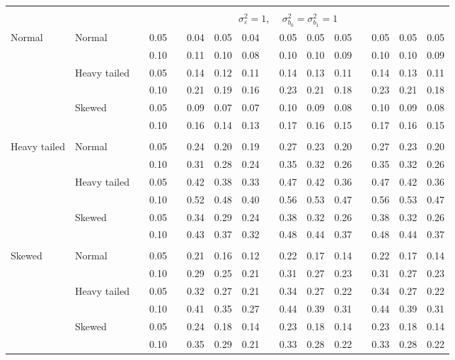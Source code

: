 \documentclass[12pt]{article} %
\begin{document}
\begin{table}[ht]
\begin{scriptsize}
\begin{center}
\begin{tabular}{ll p{.1cm} c p{.1cm} rrr p{.1cm} rrr p{.1cm} rrr}
&&&&&&&&&&&&&&&\\
& && && \multicolumn{9}{c}{$\sigma_{\varepsilon}^2 = 1$, \ \ $\sigma_{b_0}^2 = \sigma_{b_1}^2 = 1$} \\ \cline{6-16}
\rowcolor{gray!20}Normal       & Normal       && 0.05 &&   0.04 & 0.05 & 0.04 && 0.05 & 0.05 & 0.05 && 0.05 & 0.05 & 0.05 \\ 
\rowcolor{gray!20}             &              && 0.10 &&   0.11 & 0.10 & 0.08 && 0.10 & 0.10 & 0.09 && 0.10 & 0.10 & 0.09 \\ 
\rowcolor{gray!20}             & Heavy tailed && 0.05 &&   0.14 & 0.12 & 0.11 && 0.14 & 0.13 & 0.11 && 0.14 & 0.13 & 0.11 \\ 
\rowcolor{gray!20}             &              && 0.10 &&   0.21 & 0.19 & 0.16 && 0.23 & 0.21 & 0.18 && 0.23 & 0.21 & 0.18 \\ 
\rowcolor{gray!20}             & Skewed       && 0.05 &&   0.09 & 0.07 & 0.07 && 0.10 & 0.09 & 0.08 && 0.10 & 0.09 & 0.08 \\ 
\rowcolor{gray!20}             &              && 0.10 &&   0.16 & 0.14 & 0.13 && 0.17 & 0.16 & 0.15 && 0.17 & 0.16 & 0.15 \\ 
             &&&&&&&&&&&&&&&\\
Heavy tailed & Normal       && 0.05 &&   0.24 & 0.20 & 0.19 && 0.27 & 0.23 & 0.20 && 0.27 & 0.23 & 0.20 \\ 
             &              && 0.10 &&   0.31 & 0.28 & 0.24 && 0.35 & 0.32 & 0.26 && 0.35 & 0.32 & 0.26 \\ 
             & Heavy tailed && 0.05 &&   0.42 & 0.38 & 0.33 && 0.47 & 0.42 & 0.36 && 0.47 & 0.42 & 0.36 \\ 
             &              && 0.10 &&   0.52 & 0.48 & 0.40 && 0.56 & 0.53 & 0.47 && 0.56 & 0.53 & 0.47 \\ 
             & Skewed       && 0.05 &&   0.34 & 0.29 & 0.24 && 0.38 & 0.32 & 0.26 && 0.38 & 0.32 & 0.26 \\ 
             &              && 0.10 &&   0.43 & 0.37 & 0.32 && 0.48 & 0.44 & 0.37 && 0.48 & 0.44 & 0.37 \\ 
             &&&&&&&&&&&&&&&\\
Skewed       & Normal       && 0.05 &&   0.21 & 0.16 & 0.12 && 0.22 & 0.17 & 0.14 && 0.22 & 0.17 & 0.14 \\ 
             &              && 0.10 &&   0.29 & 0.25 & 0.21 && 0.31 & 0.27 & 0.23 && 0.31 & 0.27 & 0.23 \\ 
             & Heavy tailed && 0.05 &&   0.32 & 0.27 & 0.21 && 0.34 & 0.27 & 0.22 && 0.34 & 0.27 & 0.22 \\ 
             &              && 0.10 &&   0.41 & 0.35 & 0.27 && 0.44 & 0.39 & 0.31 && 0.44 & 0.39 & 0.31 \\ 
             & Skewed       && 0.05 &&   0.24 & 0.18 & 0.14 && 0.23 & 0.18 & 0.14 && 0.23 & 0.18 & 0.14 \\ 
             &              && 0.10 &&   0.35 & 0.29 & 0.21 && 0.33 & 0.28 & 0.22 && 0.33 & 0.28 & 0.22 \\ 



\end{tabular}
\end{center}
\end{scriptsize}
\end{table}
\end{document}
